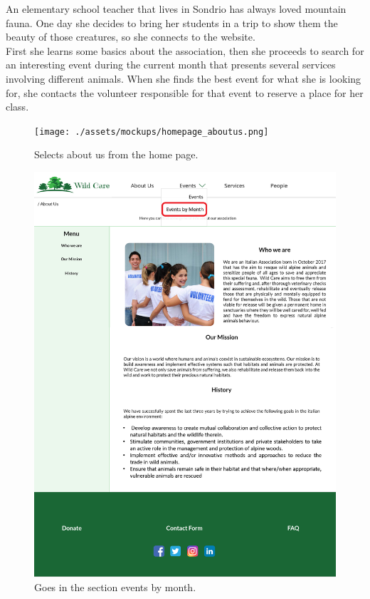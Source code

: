 An elementary school teacher that lives in Sondrio has always loved mountain fauna. One day she decides to bring her students in a trip to show them the beauty of those creatures, so she connects to the website.\\
First she learns some basics about the association, then she proceeds to search for an interesting event during the current month that presents several services involving different animals. When she finds the best event for what she is looking for, she contacts the volunteer responsible for that event to reserve a place for her class.
	\begin{figure}[h!]
		\centering
		\begin{minipage}[b]{0.8\textwidth}
    			\texttt{[image: ./assets/mockups/homepage\_aboutus.png]}
			\caption{Selects about us from the home page.}
		\end{minipage}
	\end{figure}

	\begin{figure}[h!]
		\centering
		\begin{minipage}[b]{1\textwidth}
    			\includegraphics[width=\textwidth]{./assets/mockups/aboutus_eventsbymonth.png}
			\caption{Goes in the section events by month.}
		\end{minipage}
	\end{figure}


